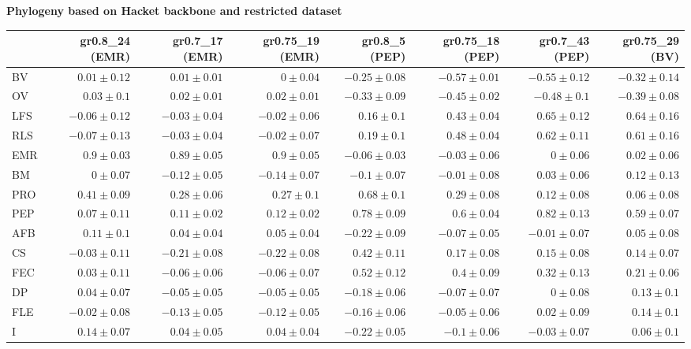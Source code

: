 \begin{landscape}
\begin{table}
\begin{footnotesize}
\textbf{Phylogeny based on Hacket backbone and restricted dataset}

\begin{tabular}{@{}l|rrrrrrr@{}}
\toprule
  & gr0.8\_24 (EMR) & gr0.7\_17 (EMR) & gr0.75\_19 (EMR) & gr0.8\_5 (PEP) & gr0.75\_18 (PEP) & gr0.7\_43 (PEP) & gr0.75\_29 (BV)\\
\midrule
BV & $0.01 \pm 0.12$ & $0.01 \pm 0.01$ & $0 \pm 0.04$ & $-0.25 \pm 0.08$ & $-0.57 \pm 0.01$ & $-0.55 \pm 0.12$ & $-0.32 \pm 0.14$\\
OV & $0.03 \pm 0.1$ & $0.02 \pm 0.01$ & $0.02 \pm 0.01$ & $-0.33 \pm 0.09$ & $-0.45 \pm 0.02$ & $-0.48 \pm 0.1$ & $-0.39 \pm 0.08$\\
LFS & $-0.06 \pm 0.12$ & $-0.03 \pm 0.04$ & $-0.02 \pm 0.06$ & $0.16 \pm 0.1$ & $0.43 \pm 0.04$ & $0.65 \pm 0.12$ & $0.64 \pm 0.16$\\
RLS & $-0.07 \pm 0.13$ & $-0.03 \pm 0.04$ & $-0.02 \pm 0.07$ & $0.19 \pm 0.1$ & $0.48 \pm 0.04$ & $0.62 \pm 0.11$ & $0.61 \pm 0.16$\\
EMR & $0.9 \pm 0.03$ & $0.89 \pm 0.05$ & $0.9 \pm 0.05$ & $-0.06 \pm 0.03$ & $-0.03 \pm 0.06$ & $0 \pm 0.06$ & $0.02 \pm 0.06$\\
BM & $0 \pm 0.07$ & $-0.12 \pm 0.05$ & $-0.14 \pm 0.07$ & $-0.1 \pm 0.07$ & $-0.01 \pm 0.08$ & $0.03 \pm 0.06$ & $0.12 \pm 0.13$\\
PRO & $0.41 \pm 0.09$ & $0.28 \pm 0.06$ & $0.27 \pm 0.1$ & $0.68 \pm 0.1$ & $0.29 \pm 0.08$ & $0.12 \pm 0.08$ & $0.06 \pm 0.08$\\
PEP & $0.07 \pm 0.11$ & $0.11 \pm 0.02$ & $0.12 \pm 0.02$ & $0.78 \pm 0.09$ & $0.6 \pm 0.04$ & $0.82 \pm 0.13$ & $0.59 \pm 0.07$\\
AFB & $0.11 \pm 0.1$ & $0.04 \pm 0.04$ & $0.05 \pm 0.04$ & $-0.22 \pm 0.09$ & $-0.07 \pm 0.05$ & $-0.01 \pm 0.07$ & $0.05 \pm 0.08$\\
CS & $-0.03 \pm 0.11$ & $-0.21 \pm 0.08$ & $-0.22 \pm 0.08$ & $0.42 \pm 0.11$ & $0.17 \pm 0.08$ & $0.15 \pm 0.08$ & $0.14 \pm 0.07$\\
FEC & $0.03 \pm 0.11$ & $-0.06 \pm 0.06$ & $-0.06 \pm 0.07$ & $0.52 \pm 0.12$ & $0.4 \pm 0.09$ & $0.32 \pm 0.13$ & $0.21 \pm 0.06$\\
DP & $0.04 \pm 0.07$ & $-0.05 \pm 0.05$ & $-0.05 \pm 0.05$ & $-0.18 \pm 0.06$ & $-0.07 \pm 0.07$ & $0 \pm 0.08$ & $0.13 \pm 0.1$\\
FLE & $-0.02 \pm 0.08$ & $-0.13 \pm 0.05$ & $-0.12 \pm 0.05$ & $-0.16 \pm 0.06$ & $-0.05 \pm 0.06$ & $0.02 \pm 0.09$ & $0.14 \pm 0.1$\\
I & $0.14 \pm 0.07$ & $0.04 \pm 0.05$ & $0.04 \pm 0.04$ & $-0.22 \pm 0.05$ & $-0.1 \pm 0.06$ & $-0.03 \pm 0.07$ & $0.06 \pm 0.1$\\
\bottomrule
\end{tabular}

\end{footnotesize}
\end{table}
\end{landscape}%


